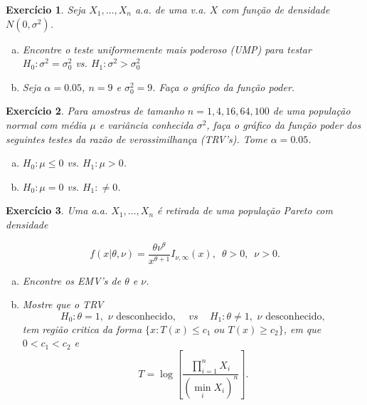 \documentclass[letter,11pt]{article}
\newtheorem{exer}{Exercício}
\begin{document}
% 
% 
% 


\begin{exer} \rm %
 Seja $X_1,\ldots,X_n$ a.a. de uma v.a. $X$ com função de densidade $N(0,\sigma^2)$.

\begin{enumerate}[a)]
\item Encontre o teste uniformemente mais poderoso (UMP) para testar $H_0:\sigma^2 =\sigma_0^2 $ vs. $H_1:\sigma^2 > \sigma_0^2 $

\item Seja $\alpha = 0.05$, $n = 9$ e $\sigma_0^2=9$.
 Faça o gráfico da função poder.
\end{enumerate}
\end{exer}


\begin{exer} \rm  %
Para amostras de tamanho $n=1,4,16,64,100$ de uma população normal com média $\mu$ e variância conhecida $\sigma^2$, faça o gráfico da função poder dos seguintes testes da razão de verossimilhança (TRV's). Tome $\alpha=0.05$.
\begin{enumerate}[a)]
\item $H_0:\mu\leq 0$  vs. $H_1:\mu>0$.
\item $H_0:\mu= 0$  vs. $H_1:\neq 0$.
\end{enumerate}
\end{exer}


\begin{exer} \rm  %
 Uma a.a. $X_1,\ldots,X_n$ é retirada de uma população Pareto com densidade

$$f(x|\theta,\nu)=\frac{\theta\nu^\theta}{x^{\theta+1}}I_{\nu,\infty}(x),\,\,\,\theta>0,\,\,\,\nu>0.$$

\begin{enumerate}[a)]
\item Encontre os EMV's de $\theta$ e $\nu$.

\item Mostre que o TRV
$$H_0: \theta=1,\,\,\nu\,\,\mbox{desconhecido},\,\,\,\,\,\,\,vs\,\,\,\,\,\,\, H_1: \theta\neq 1,\,\,\nu\,\,\mbox{desconhecido},$$
tem região critica da forma $\{x:T(x)\leq c_1\,\,ou\,\,T(x)\geq c_2\}$, em que $0<c_1<c_2$ e $$T=\log \left[ \frac{\prod_{i=1}^{n}X_i}{(\min_i X_i)^n}\right].$$
\end{enumerate}
\end{exer}
\end{document}
